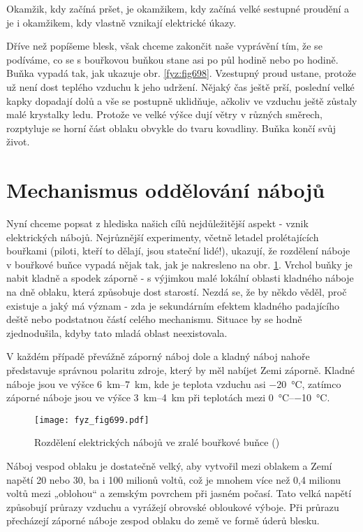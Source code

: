     Okamžik, kdy začíná pršet, je okamžikem, kdy začíná velké sestupné proudění a je i okamžikem,
    kdy vlastně vznikají elektrické úkazy.

    Dříve než popíšeme blesk, však chceme zakončit naše vyprávění tím, že se podíváme, co se s
    bouřkovou buňkou stane asi po půl hodině nebo po hodině. Buňka vypadá tak, jak ukazuje obr.
    \ref{fyz:fig698}. Vzestupný proud ustane, protože už není dost teplého vzduchu k jeho
    udržení. Nějaký čas ještě prší, poslední velké kapky dopadají dolů a vše se postupně uklidňuje,
    ačkoliv ve vzduchu ještě zůstaly malé krystalky ledu. Protože ve velké výšce dují větry v
    různých směrech, rozptyluje se horní část oblaku obvykle do tvaru kovadliny. Buňka končí svůj
    život.
 
  \section{Mechanismus oddělování nábojů}\label{fyz:IIchapIXsecV} 
    Nyní chceme popsat z hlediska našich cílů nejdůležitější aspekt - vznik elektrických nábojů.
    Nejrůznější experimenty, včetně letadel prolétajících bouřkami (piloti, kteří to dělají, jsou
    stateční lidé!), ukazují, že rozdělení náboje v bouřkové buňce vypadá nějak tak, jak je
    nakresleno na obr. \ref{fyz:fig699}. Vrchol buňky je nabit kladně a spodek záporně - s výjimkou
    malé lokální oblasti kladného náboje na dně oblaku, která způsobuje dost starostí. Nezdá se, že
    by někdo věděl, proč existuje a jaký má význam - zda je sekundárním efektem kladného padajícího
    deště nebo podstatnou částí celého mechanismu. Situace by se hodně zjednodušila, kdyby tato
    mladá oblast neexistovala.

    V každém případě převážně záporný náboj dole a kladný náboj nahoře představuje správnou polaritu
    zdroje, který by měl nabíjet Zemi záporně. Kladné náboje jsou ve výšce \SIrange{6}{7}{\km}, kde
    je teplota vzduchu asi \SI{-20}{\degreeCelsius}, zatímco záporné náboje jsou ve výšce
    \SIrange{3}{4}{\km} při teplotách mezi \SIrange{0}{-10}{\degreeCelsius}.

    \begin{figure}[ht!] %
      \centering
      \texttt{[image: fyz\_fig699.pdf]}
      \caption{Rozdělení elektrických nábojů ve zralé bouřkové buňce (\cite[s.~707]{Feynman02})}
      \label{fyz:fig699}
    \end{figure}

    Náboj vespod oblaku je dostatečně velký, aby vytvořil mezi oblakem a Zemí napětí 20 nebo 30, ba
    i 100 milionů voltů, což je mnohem více než 0,4 milionu voltů mezi „oblohou“ a zemským povrchem
    při jasném počasí. Tato velká napětí způsobují průrazy vzduchu a vyrážejí obrovské obloukové
    výboje. Při průrazu přecházejí záporné náboje zespod oblaku do země ve formě úderů blesku.

